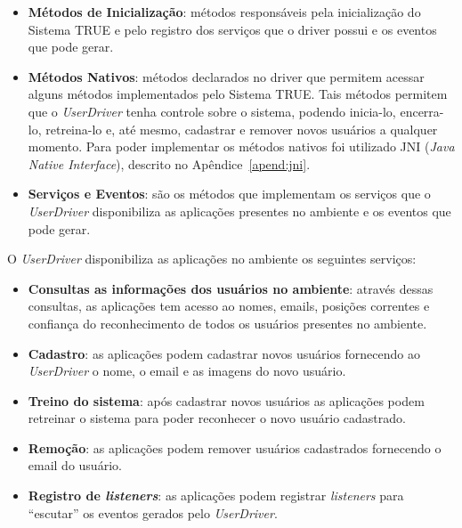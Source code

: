 \begin{itemize}
	\item \textbf{Métodos de Inicialização}: métodos responsáveis pela inicialização do Sistema TRUE e pelo registro dos serviços que o driver possui e os eventos que pode gerar.

	\item \textbf{Métodos Nativos}: métodos declarados no driver que permitem acessar alguns métodos implementados pelo Sistema TRUE. Tais métodos permitem que o \textit{UserDriver} tenha controle sobre o sistema, podendo inicia-lo, encerra-lo, retreina-lo e, até mesmo, cadastrar e remover novos usuários a qualquer momento. Para poder implementar os métodos nativos foi utilizado JNI (\textit{Java Native Interface}), descrito no Apêndice~\ref{apend:jni}.

	\item \textbf{Serviços e Eventos}: são os métodos que implementam os serviços que o \textit{UserDriver} disponibiliza as aplicações presentes no ambiente e os eventos que pode gerar. 


\end{itemize}

O \textit{UserDriver} disponibiliza as aplicações no ambiente os seguintes serviços:

	\begin{itemize}
		\item \textbf{Consultas as informações dos usuários no ambiente}: através dessas consultas, as aplicações tem acesso ao nomes, emails, posições correntes e confiança do reconhecimento de todos os usuários presentes no ambiente.
		\item \textbf{Cadastro}: as aplicações podem cadastrar novos usuários fornecendo ao \textit{UserDriver} o nome, o email e as imagens do novo usuário.
		\item \textbf{Treino do sistema}: após cadastrar novos usuários as aplicações podem retreinar o sistema para poder reconhecer o novo usuário cadastrado.
		\item \textbf{Remoção}: as aplicações podem remover usuários cadastrados fornecendo o email do usuário.
		\item \textbf{Registro de \textit{listeners}}: as aplicações podem registrar \textit{listeners} para ``escutar'' os eventos gerados pelo \textit{UserDriver}.
	\end{itemize}

